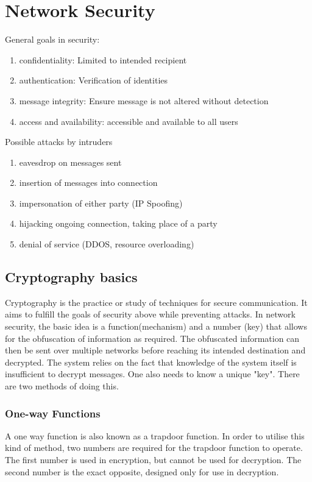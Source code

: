 \documentclass{article}
\begin{document}
\section{Network Security}
General goals in security:
\begin{enumerate}
    \item confidentiality: Limited to intended recipient
    \item authentication: Verification of identities
    \item message integrity: Ensure message is not altered without detection
    \item access and availability: accessible and available to all users
\end{enumerate}

Possible attacks by intruders
\begin{enumerate}
    \item eavesdrop on messages sent
    \item insertion of messages into connection
    \item impersonation of either party (IP Spoofing)
    \item hijacking ongoing connection, taking place of a party
    \item denial of service (DDOS, resource overloading)
\end{enumerate}
\pagebreak
\subsection{Cryptography basics}
Cryptography is the practice or study of techniques for secure communication. It aims to fulfill the goals of security above while preventing attacks. In network security, the basic idea is a function(mechanism) and a number (key) that allows for the obfuscation of information as required. The obfuscated information can then be sent over multiple networks before reaching its intended destination and decrypted. The system relies on the fact that knowledge of the system itself is insufficient to decrypt messages. One also needs to know a unique "key". There are two methods of doing this.
\subsubsection{One-way Functions}
A one way function is also known as a trapdoor function. In order to utilise this kind of method, two numbers are required for the trapdoor function to operate. The first number is used in encryption, but cannot be used for decryption. The second number is the exact opposite, designed only for use in decryption.
\end{document}
